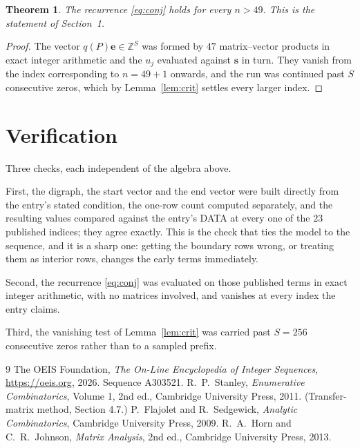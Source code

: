 \documentclass[11pt,a4paper]{article}
\theoremstyle{plain}
\newtheorem{theorem}{Theorem}
\theoremstyle{definition}
\begin{document}
\begin{theorem}
The recurrence \eqref{eq:conj} holds for every $n>49$. This is the statement of
Section~1.
\end{theorem}

\begin{proof}
The vector $q(P)\mathbf{e}\in\mathbb{Z}^{S}$ was formed by $47$ matrix--vector
products in exact integer arithmetic and the $u_j$ evaluated against $\mathbf{s}$ in turn.
They vanish from the index corresponding to $n=49+1$ onwards, and the run was continued
past $S$ consecutive zeros, which by Lemma~\ref{lem:crit} settles every larger index.
\end{proof}

\section{Verification}

Three checks, each independent of the algebra above.

First, the digraph, the start vector and the end vector were built directly from the
entry's stated condition, the one-row count computed separately, and the resulting values
compared against the entry's DATA at every one of the $23$ published indices; they
agree exactly. This is the check that ties the model to the sequence, and it is a sharp one:
getting the boundary rows wrong, or treating them as interior rows, changes the early terms
immediately.

Second, the recurrence \eqref{eq:conj} was evaluated on those published terms in exact
integer arithmetic, with no matrices involved, and vanishes at every index the entry claims.

Third, the vanishing test of Lemma~\ref{lem:crit} was carried past $S=256$ consecutive
zeros rather than to a sampled prefix.

\begin{thebibliography}{9}
 The OEIS Foundation, \emph{The On-Line Encyclopedia of Integer
Sequences}, \url{https://oeis.org}, 2026. Sequence A303521.
 R.~P.~Stanley, \emph{Enumerative Combinatorics}, Volume 1, 2nd ed.,
Cambridge University Press, 2011. (Transfer-matrix method, Section 4.7.)
 P.~Flajolet and R.~Sedgewick, \emph{Analytic Combinatorics}, Cambridge
University Press, 2009.
 R.~A.~Horn and C.~R.~Johnson, \emph{Matrix Analysis}, 2nd ed., Cambridge
University Press, 2013.
\end{thebibliography}
\end{document}
